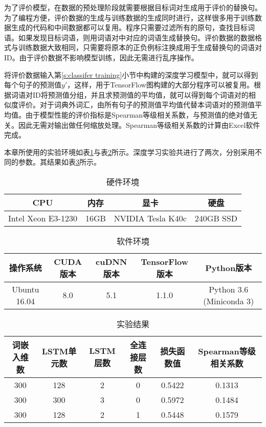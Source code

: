 为了评价模型，在数据的预处理阶段就需要根据目标词对生成用于评价的替换句。为了编程方便，评价数据的生成与训练数据的生成同时进行，这样很多用于训练数据生成的代码和中间数据都可以复用。程序只需要过滤所有的原句，查找目标词语。如果发现目标词语，则用词语对中对应的词语生成替换句。评价数据的数据格式与训练数据大致相同，只需要将原本的正负例标注换成用于生成替换句的词语对ID。由于评价数据不影响模型训练，因此无需进行乱序操作。

将评价数据输入第\ref{s:classifer training}小节中构建的深度学习模型中，就可以得到每个句子的预测值$y'$，这样，用于TensorFlow图构建的大部分程序可以被复用。根据词语对ID将预测值分组，并且求预测值的平均值，就可以得到每个词语对的相似度评价。对于词典外词汇，由所有句子的预测值平均值代替本词语对的预测值平均值。由于模型性能的评价指标是Spearman等级相关系数，与预测值的绝对值无关。因此无需对输出做任何缩放处理。Spearman等级相关系数的计算由Excel软件完成。

本章所使用的实验环境如表\ref{t:hw environment}与表\ref{t:sw environment}所示。深度学习实验共进行了两次，分别采用不同的参数。其结果如表\ref{t:classifer result}所示。
\begin{table}[h]
	\caption{硬件环境}
	\label{t:hw environment}
	\vspace{0.5em}\centering\wuhao
	\begin{tabular}{cccc}
		\toprule[1.5pt]
		CPU & 内存 & 显卡 & 硬盘 \\
		\midrule[1pt]
		Intel Xeon E3-1230 & 16GB & NVIDIA Tesla K40c & 240GB SSD \\
		\bottomrule[1.5pt]
	\end{tabular}
\end{table}

\begin{table}[h]
	\caption{软件环境}
	\label{t:sw environment}
	\vspace{0.5em}\centering\wuhao
	\begin{tabular}{ccccc}
		\toprule[1.5pt]
		操作系统 & CUDA版本 & cuDNN版本 & TensorFlow版本 & Python版本 \\
		\midrule[1pt]
		Ubuntu 16.04 & 8.0 & 5.1 & 1.1.0 & Python 3.6 (Miniconda 3) \\
		\bottomrule[1.5pt]
	\end{tabular}
\end{table}


\begin{table}[h]
	\caption{实验结果}
	\label{t:classifer result}
	\vspace{0.5em}\centering\wuhao
	\begin{tabular}{cccccc}
		\toprule[1.5pt]
		词嵌入维数 & LSTM单元数 & LSTM层数 & 全连接层数 & 损失函数值 & Spearman等级相关系数 \\
		\midrule[1pt]
		300 & 128 & 2 & 0 & 0.5422 & 0.1313 \\
		300 & 300 & 3 & 0 & 0.5972 & 0.1484 \\
		300 & 128 & 2 & 1 & 0.5448 & 0.1579 \\
		\bottomrule[1.5pt]
	\end{tabular}
\end{table}

